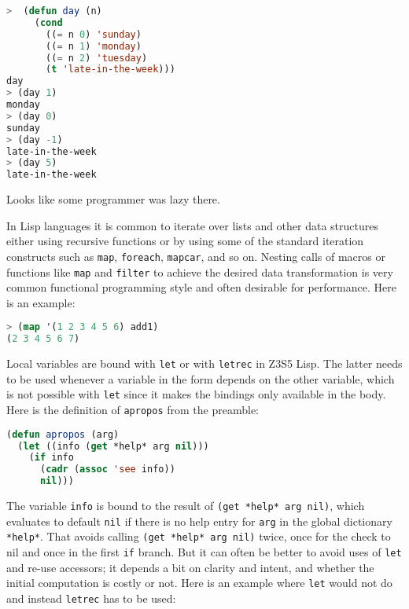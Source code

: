 \documentclass[
]{article}
\newcommand{\passthrough}[1]{#1}
\begin{document}
\begin{lstlisting}[language=Lisp]
>  (defun day (n)
     (cond 
       ((= n 0) 'sunday)
       ((= n 1) 'monday)
       ((= n 2) 'tuesday)
       (t 'late-in-the-week)))
day
> (day 1)
monday
> (day 0)
sunday
> (day -1)
late-in-the-week
> (day 5)
late-in-the-week
\end{lstlisting}

Looks like some programmer was lazy there.

In Lisp languages it is common to iterate over lists and other data
structures either using recursive functions or by using some of the
standard iteration constructs such as \passthrough{\lstinline!map!},
\passthrough{\lstinline!foreach!}, \passthrough{\lstinline!mapcar!}, and
so on. Nesting calls of macros or functions like
\passthrough{\lstinline!map!} and \passthrough{\lstinline!filter!} to
achieve the desired data transformation is very common functional
programming style and often desirable for performance. Here is an
example:

\begin{lstlisting}[language=Lisp]
> (map '(1 2 3 4 5 6) add1)
(2 3 4 5 6 7)
\end{lstlisting}

Local variables are bound with \passthrough{\lstinline!let!} or with
\passthrough{\lstinline!letrec!} in Z3S5 Lisp. The latter needs to be
used whenever a variable in the form depends on the other variable,
which is not possible with \passthrough{\lstinline!let!} since it makes
the bindings only available in the body. Here is the definition of
\passthrough{\lstinline!apropos!} from the preamble:

\begin{lstlisting}[language=Lisp]
(defun apropos (arg)
  (let ((info (get *help* arg nil)))
    (if info
      (cadr (assoc 'see info))
      nil)))
\end{lstlisting}

The variable \passthrough{\lstinline!info!} is bound to the result of
\passthrough{\lstinline!(get *help* arg nil)!}, which evaluates to
default \passthrough{\lstinline!nil!} if there is no help entry for
\passthrough{\lstinline!arg!} in the global dictionary
\passthrough{\lstinline!*help*!}. That avoids calling
\passthrough{\lstinline!(get *help* arg nil)!} twice, once for the check
to nil and once in the first \passthrough{\lstinline!if!} branch. But it
can often be better to avoid uses of \passthrough{\lstinline!let!} and
re-use accessors; it depends a bit on clarity and intent, and whether
the initial computation is costly or not. Here is an example where
\passthrough{\lstinline!let!} would not do and instead
\passthrough{\lstinline!letrec!} has to be used:
\end{document}
